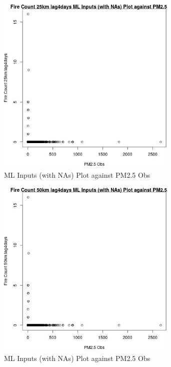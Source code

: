 \begin{figure} 
\centering  
\includegraphics[width=0.77\textwidth]{Code_Outputs/Report_ML_input_PM25_Step4_part_e_de_duplicated_aves_compiled_2019-05-20wNAs_Fire_Count_25km_lag4daysvPM25_Obs.jpg} 
\caption{\label{fig:Report_ML_input_PM25_Step4_part_e_de_duplicated_aves_compiled_2019-05-20wNAsFire_Count_25km_lag4daysvPM25_Obs}ML Inputs (with NAs) Plot against PM2.5 Obs} 
\end{figure} 
 

\begin{figure} 
\centering  
\includegraphics[width=0.77\textwidth]{Code_Outputs/Report_ML_input_PM25_Step4_part_e_de_duplicated_aves_compiled_2019-05-20wNAs_Fire_Count_50km_lag4daysvPM25_Obs.jpg} 
\caption{\label{fig:Report_ML_input_PM25_Step4_part_e_de_duplicated_aves_compiled_2019-05-20wNAsFire_Count_50km_lag4daysvPM25_Obs}ML Inputs (with NAs) Plot against PM2.5 Obs} 
\end{figure} 
 

